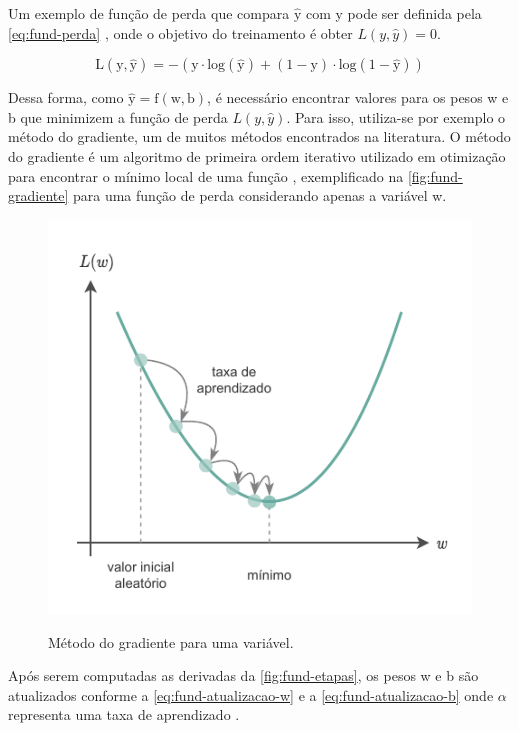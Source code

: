 Um exemplo de função de perda que compara $\mathrm{\hat{y}}$ com y pode ser definida pela \autoref{eq:fund-perda} \cite{ref:Ng}, onde o objetivo do treinamento é obter $L(y,\hat{y}) = 0$.

\begin{equation} \label{eq:fund-perda}
  \mathrm{
    L(y,\hat{y}) = -(y \cdot log(\hat{y}) + (1 - y) \cdot log(1 - \hat{y}))
  }
\end{equation}

Dessa forma, como $\mathrm{\hat{y} = f(w, b)}$, é necessário encontrar valores para os pesos w e b que minimizem a função de perda $L(y,\hat{y})$. Para isso, utiliza-se por exemplo o método do gradiente, um de muitos métodos encontrados na literatura. O método do gradiente é um algoritmo de primeira ordem iterativo utilizado em otimização para encontrar o mínimo local de uma função \cite{ref:Yan}, exemplificado na \autoref{fig:fund-gradiente} para uma função de perda considerando apenas a variável w.

\begin{figure}[h!] %
  \centering
  \caption{Método do gradiente para uma variável.}
  \includegraphics[scale=1.3]{img/img-fundamentacao-gradiente.pdf}
  \label{fig:fund-gradiente}
\end{figure}


Após serem computadas as derivadas da \autoref{fig:fund-etapas}, os pesos w e b são atualizados conforme a \autoref{eq:fund-atualizacao-w} e a \autoref{eq:fund-atualizacao-b} onde $\alpha$ representa uma taxa de aprendizado \cite{ref:Ng}.

